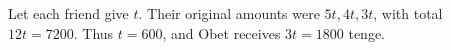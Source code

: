 Let each friend give $t$. Their original amounts were $5t,4t,3t$, with total $12t=7200$. Thus $t=600$, and Obet receives $3t=\boxed{1800}$ tenge.
